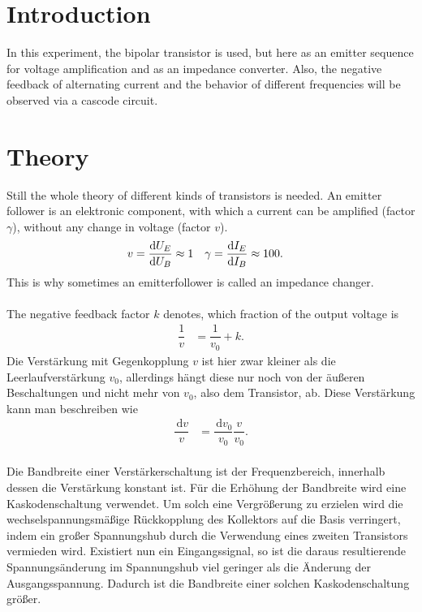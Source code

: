 \documentclass[a4paper,10pt]{article}
\newcommand{\td}{\,\text{d}}
\numberwithin{equation}{section}
\begin{document}
\begin{multicols}{2}
	\sloppy
	\section{Introduction}
	In this experiment, the bipolar transistor is used, but here as an emitter sequence for voltage amplification and as an impedance converter.
	Also, the negative feedback of alternating current and the behavior of different frequencies will be observed via a cascode circuit.

	\section{Theory}
	Still the whole theory of different kinds of transistors is needed.
	An emitter follower is an elektronic component, with which a current can be amplified (factor $\gamma $), without any change in voltage (factor $v$).
	\begin{align}
		v & = \diff[]{U_E}{U_B}\approx 1 & \gamma & = \diff[]{I_E}{I_B}\approx 100
		.\end{align}
	This is why sometimes an emitterfollower is called an impedance changer.
	\\\\ The negative feedback factor $k$ denotes, which fraction of the output voltage is
	\begin{align}
		\dfrac{1}{v} & = \dfrac{1}{v_0}+k
		.\end{align}
	Die Verstärkung mit Gegenkopplung $v$ ist hier zwar kleiner als die Leerlaufverstärkung $v_0$, allerdings hängt diese nur noch von der äußeren Beschaltungen und nicht mehr von $v_0$, also dem Transistor, ab.
	Diese Verstärkung kann man beschreiben wie
	\begin{align}
		\dfrac{\td v}{v} & = \dfrac{\td v_0}{v_0}\dfrac{v}{v_0}
		.\end{align}
	\\Die Bandbreite einer Verstärkerschaltung ist der Frequenzbereich, innerhalb dessen die Verstärkung konstant ist.
	Für die Erhöhung der Bandbreite wird eine Kaskodenschaltung verwendet.
	Um solch eine Vergrößerung zu erzielen wird die wechselspannungsmäßige Rückkopplung des Kollektors auf die Basis verringert, indem ein großer Spannungshub durch die Verwendung eines zweiten Transistors vermieden wird.
	Existiert nun ein Eingangssignal, so ist die daraus resultierende Spannungsänderung im Spannungshub viel geringer als die Änderung der Ausgangsspannung.
	Dadurch ist die Bandbreite einer solchen Kaskodenschaltung größer.

\end{multicols}
\end{document}
